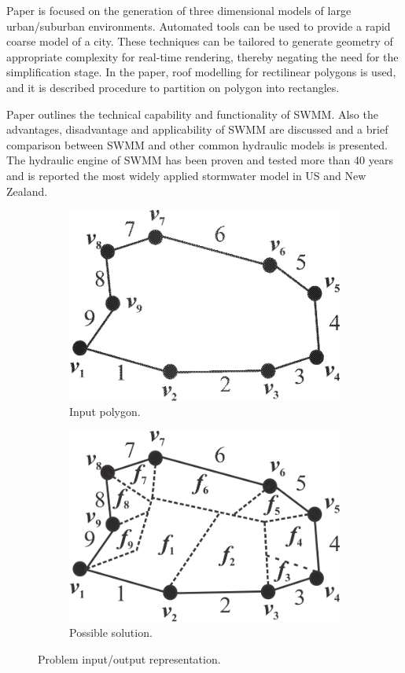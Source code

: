 \documentclass[11pt,leqno]{book}
\begin{document}
Paper \cite{lay:day:1} is focused on the generation of three dimensional models of large urban/suburban environments. Automated tools can be used to provide a rapid coarse model of a city. These techniques can be tailored to generate geometry of appropriate complexity for real-time rendering, thereby negating the need for the simplification stage. In the paper, roof modelling for rectilinear polygons is used, and it is described  procedure to partition  on polygon into rectangles.

Paper \cite{lockie:1} outlines the technical capability and functionality of SWMM. Also the advantages, disadvantage and applicability of SWMM are discussed and a brief comparison between SWMM and other common hydraulic models is presented. The hydraulic engine of SWMM has been proven and tested more than 40 years and is reported the most widely applied stormwater model in US and New Zealand.

\begin{figure}[h!]
\centering
\begin{subfigure}{.5\textwidth}
  \centering
  \includegraphics[width=.5\linewidth]{pic01.png}
  \caption{Input polygon.}
  \label{fig:sub1}
\end{subfigure}%
\begin{subfigure}{.5\textwidth}
  \centering
  \includegraphics[width=.5\linewidth]{pic03.png}
  \caption{Possible solution.}
  \label{fig:sub2}
\end{subfigure}
\caption{Problem input/output representation.}
\label{fig:one}
\end{figure}
\FloatBarrier
\end{document}
